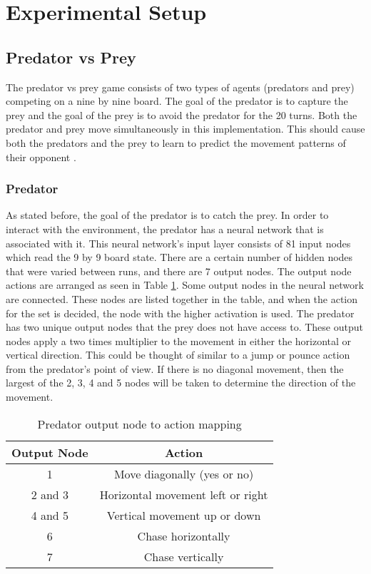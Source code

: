 
\section{Experimental Setup} \label{sec:exp-setup}
\subsection{Predator vs Prey}
	The predator vs prey game consists of two types of agents (predators and prey) competing on a nine by nine board. The goal of the predator is to capture the prey and the goal of the prey is to avoid the predator for the 20 turns.  Both the predator and prey move simultaneously in this implementation. This should cause both the predators and the prey to learn to predict the movement patterns of their opponent .
	
\subsubsection{Predator}
  As stated before, the goal of the predator is to catch the prey. In order to interact with the environment, the predator has a neural network that is associated with it. This neural network’s input layer consists of 81 input nodes which read the 9 by 9 board state. There are a certain number of hidden nodes that were varied between runs, and there are 7 output nodes. The output node actions are arranged as seen in Table \ref{tab:pred-actions}. Some output nodes in the neural network are connected. These nodes are listed together in the table, and when the action for the set is decided, the node with the higher activation is used. The predator has two unique output nodes that the prey does not have access to. These output nodes apply a two times multiplier to the movement in either the horizontal or vertical direction. This could be thought of similar to a jump or pounce action from the predator's point of view. If there is no diagonal movement, then the largest of the 2, 3, 4 and 5 nodes will be taken to determine the direction of the movement.
				
\begin{table}
  \centering
  \begin{tabular}{|c|c|}
    \hline
    Output Node & Action \\
    \hline
    1 & Move diagonally (yes or no)\\
    2 and 3 & Horizontal movement left or right \\
    4 and 5 & Vertical movement up or down \\
    6 & Chase horizontally \\
    7 & Chase vertically \\
    \hline
  \end{tabular}
  \caption{Predator output node to action mapping}
  \label{tab:pred-actions}
\end{table}

